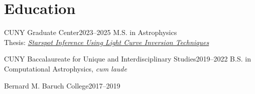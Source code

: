 \section{Education}

\begin{jobshort}{CUNY Graduate Center}{2023--2025}
M.S. in Astrophysics\\
Thesis:
\href{https://academicworks.cuny.edu/gc_etds/6480/}
{\emph{Starspot Inference Using Light Curve Inversion Techniques}}
\end{jobshort}

\vspace{0.4em}

\begin{jobshort}{CUNY Baccalaureate for Unique and Interdisciplinary Studies}{2019--2022}
B.S. in Computational Astrophysics, \emph{cum laude}
\end{jobshort}

\vspace{0.4em}

\begin{jobshort}{Bernard M. Baruch College}{2017--2019}
\end{jobshort}